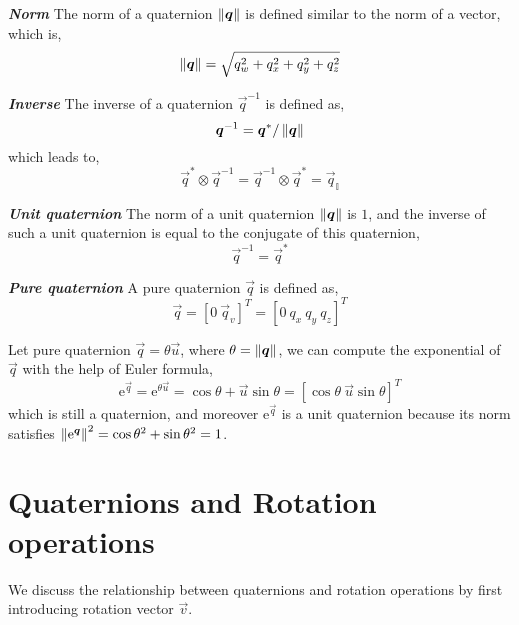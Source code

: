 \textbf{\textit{Norm}} The norm of a quaternion $\left\|\boldsymbol{q}\right\|$ is defined similar to the norm of a vector, which is,
\begin{equation}\label{q9}
	\left\|\boldsymbol{q}\right\| = \sqrt{q_w^2+q_x^2+q_y^2+q_z^2}
\end{equation}

\textbf{\textit{Inverse}} The inverse of a quaternion $\vec{q}^{-1}$ is defined as,
\begin{equation}\label{q10}
	\boldsymbol{q}^{-1} = \boldsymbol{q}^* / \left\|\boldsymbol{q}\right\|
\end{equation}
which leads to,
\begin{equation}\label{q11}
	\vec{q}^* \otimes \vec{q}^{-1} = \vec{q}^{-1} \otimes \vec{q}^*  = \vec{q}_{\mathbb{I}}
\end{equation}

\textbf{\textit{Unit quaternion}} The norm of a unit quaternion $\left\|\boldsymbol{q}\right\|$ is $1$, and the inverse of such a unit quaternion is equal to the conjugate of this quaternion,
\begin{equation}\label{q12}
	\vec{q}^{-1} = \vec{q}^*
\end{equation}

\textbf{\textit{Pure quaternion}} A pure quaternion $\vec{q}$ is defined as,
\begin{equation}\label{q13}
	\vec{q} = \left[0 \ \vec{q}_v \right]^T = \left[0 \ q_x \ q_y \ q_z \right]^T
\end{equation}

Let pure quaternion $\vec{q} = \theta\vec{u}$, where $\theta = \left\|\boldsymbol{q}\right\|$, we can compute the exponential of $\vec{q}$ with the help of Euler formula,
\begin{equation}\label{q14}
	\mathrm{e}^{\vec{q}} = \mathrm{e}^{\theta\vec{u}} = \cos{\theta} + \vec{u}\sin{\theta} = \left[\cos{\theta} \ \vec{u}\sin{\theta} \right]^T
\end{equation}
which is still a quaternion, and moreover $\mathrm{e}^{\vec{q}}$ is a unit quaternion because its norm satisfies $\left\|\mathrm{e}^{\boldsymbol{q}}\right\|^2 = \cos{\theta}^2 + \sin{\theta}^2 = 1$.

\section{Quaternions and Rotation operations}
\label{sec:quat_and_rot}

We discuss the relationship between quaternions and rotation operations by first introducing rotation vector $\vec{v}$. 

